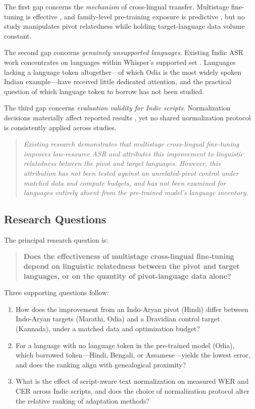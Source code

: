 \documentclass[conference]{IEEEtran}
\begin{document}
The first gap concerns the \emph{mechanism} of cross-lingual transfer.
Multistage fine-tuning is effective \cite{pillai2024multistage}, and
family-level pre-training exposure is predictive
\cite{rouditchenko2023unseen}, but no study manipulates pivot relatedness
while holding target-language data volume constant.

The second gap concerns \emph{genuinely unsupported languages}. Existing
Indic ASR work concentrates on languages within Whisper's supported set
\cite{bhogale2023vistaar}. Languages lacking a language token
altogether---of which Odia is the most widely spoken Indian
example---have received little dedicated attention, and the practical
question of which language token to borrow has not been studied.

The third gap concerns \emph{evaluation validity for Indic scripts}.
Normalization decisions materially affect reported results
\cite{pillai2024multistage}, yet no shared normalization protocol is
consistently applied across studies.

\begin{quote}
\emph{Existing research demonstrates that multistage cross-lingual
fine-tuning improves low-resource ASR and attributes this improvement to
linguistic relatedness between the pivot and target languages. However,
this attribution has not been tested against an unrelated-pivot control
under matched data and compute budgets, and has not been examined for
languages entirely absent from the pre-trained model's language
inventory.}
\end{quote}

\subsection{Research Questions}

The principal research question is:

\begin{quote}
\textbf{Does the effectiveness of multistage cross-lingual fine-tuning
depend on linguistic relatedness between the pivot and target languages,
or on the quantity of pivot-language data alone?}
\end{quote}

Three supporting questions follow:

\begin{enumerate}
\item How does the improvement from an Indo-Aryan pivot (Hindi) differ
between Indo-Aryan targets (Marathi, Odia) and a Dravidian control
target (Kannada), under a matched data and optimization budget?

\item For a language with no language token in the pre-trained model
(Odia), which borrowed token---Hindi, Bengali, or Assamese---yields the
lowest error, and does the ranking align with genealogical proximity?

\item What is the effect of script-aware text normalization on measured
WER and CER across Indic scripts, and does the choice of normalization
protocol alter the relative ranking of adaptation methods?
\end{enumerate}
\end{document}
